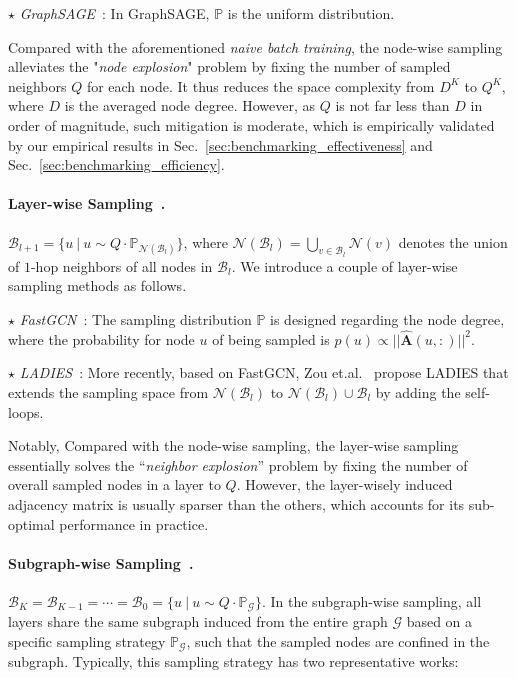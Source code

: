 \message{ !name(main.tex)}\documentclass{article}
\newcommand{\bm}[1]{\mathbf{#1}}
\begin{document}
\(\star\) \textit{GraphSAGE}~\citep{hamilton2017inductive}: In GraphSAGE, \(\mathbb{P}\) is the uniform distribution.

Compared with the aforementioned \textit{naive batch training}, the node-wise sampling~\citep{hamilton2017inductive} alleviates the "\textit{node explosion}" problem by fixing the number of sampled neighbors \(Q\) for each node. It thus reduces the space complexity from \(D^K\) to \(Q^K\), where \(D\) is the averaged node degree. However, as \(Q\) is not far less than \(D\) in order of magnitude, such mitigation is moderate, which is empirically validated by our empirical results in Sec.~\ref{sec:benchmarking_effectiveness} and Sec.~\ref{sec:benchmarking_efficiency}.

\vspace{-2mm}
\paragraph{Layer-wise Sampling~\cite{chen2018fastgcn,zou2019layer}.}\label{sec:layer_wise_sampling}
\(\mathcal{B}_{l+1} = \{ u \ |\ u \sim Q \cdot \mathbb{P}_{\mathcal{N}(\mathcal{B}_{l})} \}\), where \(\mathcal{N}(\mathcal{B}_l) = \bigcup_{v \in \mathcal{B}_l} \mathcal{N}(v)\) denotes the union of \(1\)-hop neighbors of all nodes in \(\mathcal{B}_l\).  We introduce a couple of layer-wise sampling methods as follows.

\(\star\) \textit{FastGCN}~\citep{chen2018fastgcn}: The sampling distribution \(\mathbb{P}\) is designed regarding the node degree, where the probability for node \(u\) of being sampled is \(p(u) \propto || \hat{\bm{A}}(u,:)||^2\).

\(\star\) \textit{LADIES}~\citep{zou2019layer}: More recently, based on FastGCN, Zou et.al.~\citep{zou2019layer} propose LADIES that extends the sampling space from \(\mathcal{N}(\mathcal{B}_l)\) to \(\mathcal{N}(\mathcal{B}_l) \cup \mathcal{B}_l\) by adding the self-loops.

Notably, Compared with the node-wise sampling, the layer-wise sampling essentially solves the ``\textit{neighbor explosion}'' problem by fixing the number of overall sampled nodes in a layer to \(Q\). However, the layer-wisely induced adjacency matrix is usually sparser than the others, which accounts for its sub-optimal performance in practice.

\vspace{-2mm}
\paragraph{Subgraph-wise Sampling~\cite{chiang2019cluster,zeng2019graphsaint}.}\label{sec:subgraph_wise_sampling}
\(\mathcal{B}_K = \mathcal{B}_{K-1} = \cdots = \mathcal{B}_0 = \{ u \ |\ u \sim Q\cdot \mathbb{P}_{\mathcal{G}} \}.\) In the subgraph-wise sampling, all layers share the same subgraph induced from the entire graph \(\mathcal{G}\) based on a specific sampling strategy \(\mathbb{P}_{\mathcal{G}}\), such that the sampled nodes are confined in the subgraph. Typically, this sampling strategy has two representative works:
\end{document}
